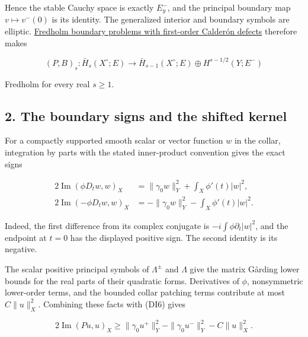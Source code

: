 \documentclass[
  11pt,
]{article}
\makeatletter
\let\ReaderOriginalAnchorStart\hyper@anchorstart
\let\ReaderOriginalAnchorEnd\hyper@anchorend
\let\ReaderPendingAliases\@empty
\def\ReaderArmAliases#1{\gdef\ReaderPendingAliases{#1}}
\def\hyper@anchorstart#1{\ReaderIfNativeAnchorTF{#1}{\ReaderPendingAliases\global\let\ReaderPendingAliases\@empty}{}\ReaderOriginalAnchorStart{#1}}
\makeatother
\begin{document}
Hence the stable Cauchy space is exactly \(E^-_y\), and the principal
boundary map \(v\mapsto v^-(0)\) is its identity. The generalized
interior and boundary symbols are elliptic.
\href{generalized-collar-fredholm.pdf}{Fredholm boundary problems with
first-order Calderón defects} therefore makes

\[
 (P,B)_s:\bar H_s(X^\circ;E)\longrightarrow
 \bar H_{s-1}(X^\circ;E)\oplus H^{s-1/2}(Y;E^-)
 \tag{DI5}
\]

Fredholm for every real \(s\geq1\).

\ReaderArmAliases{\ReaderOriginalAnchorStart{AN03-SDI-002}\ReaderOriginalAnchorEnd\begingroup\expandafter\def\csname @currentHref\endcsname{AN03-SDI-002}\label{AN03-SDI-002}\endgroup\ReaderOriginalAnchorStart{2-the-boundary-signs-and-the-shifted-kernel}\ReaderOriginalAnchorEnd\begingroup\expandafter\def\csname @currentHref\endcsname{2-the-boundary-signs-and-the-shifted-kernel}\label{2-the-boundary-signs-and-the-shifted-kernel}\endgroup\ReaderOriginalAnchorStart{the-boundary-signs-and-the-shifted-kernel}\ReaderOriginalAnchorEnd}
\subsection{2. The boundary signs and the shifted
kernel}\label{the-boundary-signs-and-the-shifted-kernel}

For a compactly supported smooth scalar or vector function \(w\) in the
collar, integration by parts with the stated inner-product convention
gives the exact signs

\[
 \begin{aligned}
 2\operatorname{Im}(\phi D_tw,w)_X
   &=\|\gamma_0w\|_Y^2+\int_X\phi'(t)|w|^2,\\
 2\operatorname{Im}(-\phi D_tw,w)_X
   &=-\|\gamma_0w\|_Y^2-\int_X\phi'(t)|w|^2.
 \end{aligned}
 \tag{DI6}
\]

Indeed, the first difference from its complex conjugate is
\(-i\int\phi\partial_t|w|^2\), and the endpoint at \(t=0\) has the
displayed positive sign. The second identity is its negative.

The scalar positive principal symbols of \(\Lambda^\pm\) and \(\Lambda\)
give the matrix Gårding lower bounds for the real parts of their
quadratic forms. Derivatives of \(\phi\), nonsymmetric lower-order
terms, and the bounded collar patching terms contribute at most
\(C\|u\|_X^2\). Combining these facts with (DI6) gives

\[
 2\operatorname{Im}(Pu,u)_X
 \geq \|\gamma_0u^+\|_Y^2-
       \|\gamma_0u^-\|_Y^2-C\|u\|_X^2.
 \tag{DI7}
\]
\end{document}
